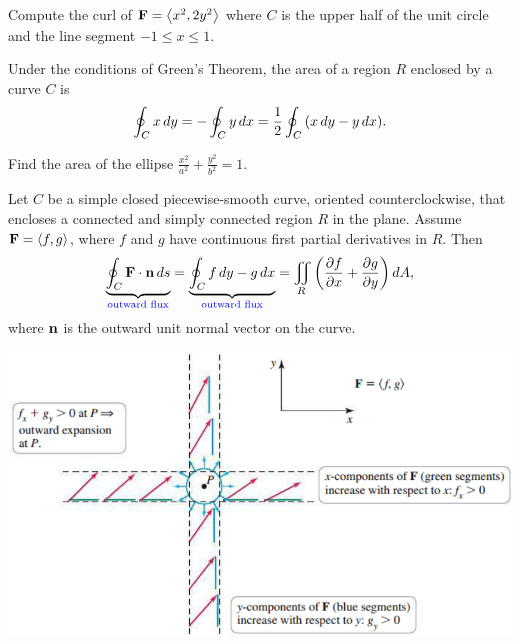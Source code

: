 \documentclass[mathNotesPreamble]{subfiles}
\begin{document}
  \begin{ex*}
    Compute the curl of $\mathbf F={\left\langle x^2,2y^2 \right\rangle}$ where $C$ is the upper half of the unit circle and the line segment $-1\leq x\leq 1$.
  \end{ex*}

  \begin{thmBox*}
    Under the conditions of Green's Theorem, the area of a region $R$ enclosed by a curve $C$ is
      \[\oint_C x\,dy=-\oint_C y\,dx=\frac{1}{2}\oint_C{\left(x\,dy-y\,dx\right)}.\]
  \end{thmBox*}

  \begin{ex*}
    Find the area of the ellipse $\displaystyle \frac{x^2}{a^2}+\frac{y^2}{b^2}=1$.
  \end{ex*}
  \pagebreak

  \begin{thmBox*}
    Let $C$ be a simple closed piecewise-smooth curve, oriented counterclockwise, that encloses a connected and simply connected region $R$ in the plane. Assume $\mathbf F={\left\langle f,g \right\rangle}$, where $f$ and $g$ have continuous first partial derivatives in $R$. Then
      \[\underbrace{\oint_C \mathbf F\cdot {\mathbf{n}}\, ds}_{\textcolor{blue}{\textnormal{outward flux}}}=\underbrace{\oint_C f\,dy-g\,dx}_{\textcolor{blue}{\textnormal{outward flux}}}=\iint\limits_R{\left(\frac{\partial f}{\partial x}+\frac{\partial g}{\partial y}\right)}\,dA,\]
    where ${\mathbf{n}}$ is the outward unit normal vector on the curve.
  \end{thmBox*}

  \begin{flushright}
    \includegraphics[width=0.9\linewidth]{images/briggs_17_04/fig17_33}
  \end{flushright}
\end{document}
